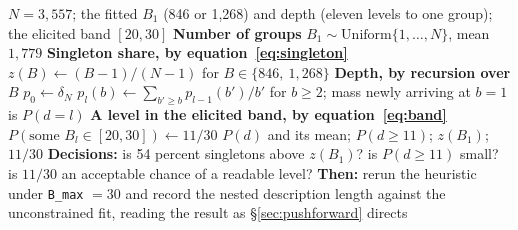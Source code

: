 \documentclass[11pt]{article}
\newcommand{\code}[1]{\texttt{\small #1}}
\begin{document}
\begin{algorithm}[!t]
\caption{Prior pushforward. Every quantity here follows from
  equation~\eqref{eq:pb} and the level recursion of
  equation~\eqref{eq:nested}; nothing is sampled and $E$ does not enter.}
\label{alg:pushforward}
\begin{algorithmic}[1]
\Require $N = 3{,}557$; the fitted $B_1$ (846 or 1{,}268) and depth (eleven
  levels to one group); the elicited band $[20, 30]$
\Statex \textbf{Number of groups}
\State $B_1 \sim \mathrm{Uniform}\{1, \dots, N\}$, mean $1{,}779$
\Statex \textbf{Singleton share, by equation~\eqref{eq:singleton}}
\State $z(B) \gets (B-1)/(N-1)$ for $B \in \{846,\ 1{,}268\}$
\Statex \textbf{Depth, by recursion over $B$}
\State $p_0 \gets \delta_N$ 
  \State $p_l(b) \gets \sum_{b' \ge b} p_{l-1}(b')/b'$ for $b \ge 2$;
    mass newly arriving at $b = 1$ is $P(d = l)$
\EndFor
\Statex \textbf{A level in the elicited band, by equation~\eqref{eq:band}}
\State $P(\text{some } B_l \in [20, 30]) \gets 11/30$
\Ensure $P(d)$ and its mean; $P(d \ge 11)$; $z(B_1)$; $11/30$
\State \textbf{Decisions:} is 54 percent singletons above $z(B_1)$? is
  $P(d \ge 11)$ small? is $11/30$ an acceptable chance of a readable level?
\State \textbf{Then:} rerun the heuristic under \code{B_max} $= 30$ and record
  the nested description length against the unconstrained fit, reading the
  result as \S\ref{sec:pushforward} directs
\end{algorithmic}
\end{algorithm}
\end{document}
